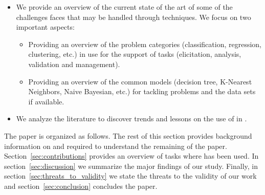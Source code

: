 \begin{itemize}
    \item We provide an overview of the current state of the art of some of the
    challenges \RE faces that may be handled through \ML techniques. We focus on
    two important aspects:
    \begin{itemize}
        \item Providing an overview of the \ML problem categories
        (classification, regression, clustering, etc.) in use for the support of
        \RE tasks (elicitation, analysis, validation and management).
        \item Providing an overview of the common \ML models (decision tree,
        K-Nearest Neighbors, Naive Bayesian, etc.) for tackling \RE problems and
        the data sets if available.
    \end{itemize}
    \item We analyze the literature to discover trends and lessons on the use of \ML in \RE.
\end{itemize}
The paper is organized as follows. The rest of this section provides
background information on \ML and \RE required to understand the remaining of
the paper. Section~\ref{sec:contributions} provides an overview of \RE tasks
where \ML has been used. In section~\ref{sec:discussion} we summarize the major
findings of our study. Finally, in section~\ref{sec:threats_to_validity} we
state the threats to the validity of our work and section~\ref{sec:conclusion}
concludes the paper.



